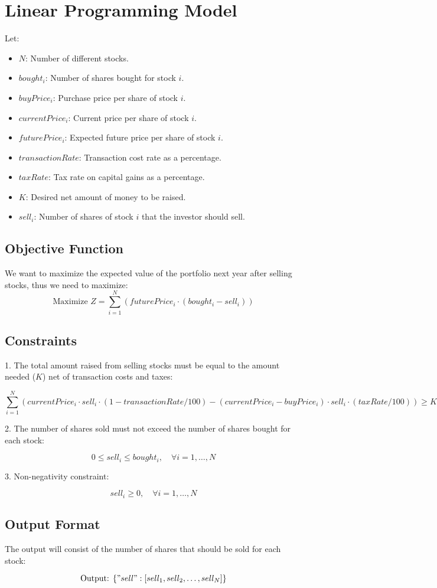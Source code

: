 \documentclass{article}
\begin{document}
\section*{Linear Programming Model}

Let:
\begin{itemize}
    \item $N$: Number of different stocks.
    \item $bought_i$: Number of shares bought for stock $i$.
    \item $buyPrice_i$: Purchase price per share of stock $i$.
    \item $currentPrice_i$: Current price per share of stock $i$.
    \item $futurePrice_i$: Expected future price per share of stock $i$.
    \item $transactionRate$: Transaction cost rate as a percentage.
    \item $taxRate$: Tax rate on capital gains as a percentage.
    \item $K$: Desired net amount of money to be raised.
    \item $sell_i$: Number of shares of stock $i$ that the investor should sell.
\end{itemize}

\subsection*{Objective Function}
We want to maximize the expected value of the portfolio next year after selling stocks, thus we need to maximize:
\[
\text{Maximize } Z = \sum_{i=1}^{N} \left( futurePrice_i \cdot (bought_i - sell_i) \right)
\]

\subsection*{Constraints}
1. The total amount raised from selling stocks must be equal to the amount needed ($K$) net of transaction costs and taxes:

\[
\sum_{i=1}^{N} \left( currentPrice_i \cdot sell_i \cdot (1 - transactionRate/100) - (currentPrice_i - buyPrice_i) \cdot sell_i \cdot (taxRate/100) \right) \geq K
\]

2. The number of shares sold must not exceed the number of shares bought for each stock:

\[
0 \leq sell_i \leq bought_i, \quad \forall i = 1, \ldots, N
\]

3. Non-negativity constraint:

\[
sell_i \geq 0, \quad \forall i = 1, \ldots, N
\]

\subsection*{Output Format}
The output will consist of the number of shares that should be sold for each stock:

\[
\text{Output: } \{ "sell": [sell_1, sell_2, \ldots, sell_N] \}
\]
\end{document}
